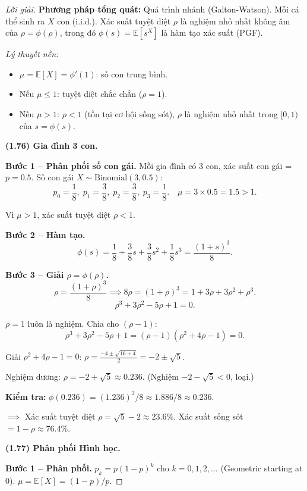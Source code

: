 \documentclass[8pt,a4paper]{article}
\newenvironment{solution}{\begin{proof}[Lời giải]}{\end{proof}}
\newcommand{\E}{\mathbb{E}}
\begin{document}
\begin{solution}
\textbf{Phương pháp tổng quát:} Quá trình nhánh (Galton-Watson). Mỗi cá thể sinh ra $X$ con (i.i.d.). Xác suất tuyệt diệt $\rho$ là nghiệm nhỏ nhất không âm của $\rho = \phi(\rho)$, trong đó $\phi(s) = \E[s^X]$ là hàm tạo xác suất (PGF).

\textit{Lý thuyết nền:}
\begin{itemize}[nosep]
  \item $\mu = \E[X] = \phi'(1)$: số con trung bình.
  \item Nếu $\mu \leq 1$: tuyệt diệt chắc chắn ($\rho = 1$).
  \item Nếu $\mu > 1$: $\rho < 1$ (tồn tại cơ hội sống sót), $\rho$ là nghiệm nhỏ nhất trong $[0,1)$ của $s = \phi(s)$.
\end{itemize}

\medskip
\textbf{(1.76) Gia đình 3 con.}

\textbf{Bước 1 -- Phân phối số con gái.}
Mỗi gia đình có 3 con, xác suất con gái = $p = 0.5$. Số con gái $X \sim \text{Binomial}(3, 0.5)$:
\[
  p_0 = \frac{1}{8}, \; p_1 = \frac{3}{8}, \; p_2 = \frac{3}{8}, \; p_3 = \frac{1}{8}. \quad \mu = 3 \times 0.5 = 1.5 > 1.
\]

Vì $\mu > 1$, xác suất tuyệt diệt $\rho < 1$.

\textbf{Bước 2 -- Hàm tạo.}
\[
  \phi(s) = \frac{1}{8} + \frac{3}{8}s + \frac{3}{8}s^2 + \frac{1}{8}s^3 = \frac{(1+s)^3}{8}.
\]

\textbf{Bước 3 -- Giải $\rho = \phi(\rho)$.}
\[
  \rho = \frac{(1+\rho)^3}{8} \implies 8\rho = (1+\rho)^3 = 1 + 3\rho + 3\rho^2 + \rho^3.
\]
\[
  \rho^3 + 3\rho^2 - 5\rho + 1 = 0.
\]

$\rho = 1$ luôn là nghiệm. Chia cho $(\rho - 1)$:
\[
  \rho^3 + 3\rho^2 - 5\rho + 1 = (\rho - 1)(\rho^2 + 4\rho - 1) = 0.
\]

Giải $\rho^2 + 4\rho - 1 = 0$: $\rho = \frac{-4 \pm \sqrt{16+4}}{2} = -2 \pm \sqrt{5}$.

Nghiệm dương: $\rho = -2 + \sqrt{5} \approx 0.236$. (Nghiệm $-2 - \sqrt{5} < 0$, loại.)

\textbf{Kiểm tra:} $\phi(0.236) = (1.236)^3/8 \approx 1.886/8 \approx 0.236$. \checkmark

$\implies$ Xác suất tuyệt diệt $\rho = \sqrt{5} - 2 \approx 23.6\%$. Xác suất sống sót $= 1 - \rho \approx 76.4\%$.

\medskip
\textbf{(1.77) Phân phối Hình học.}

\textbf{Bước 1 -- Phân phối.}
$p_k = p(1-p)^k$ cho $k = 0, 1, 2, \ldots$ (Geometric starting at 0). $\mu = \E[X] = (1-p)/p$.


\end{solution}
\end{document}
